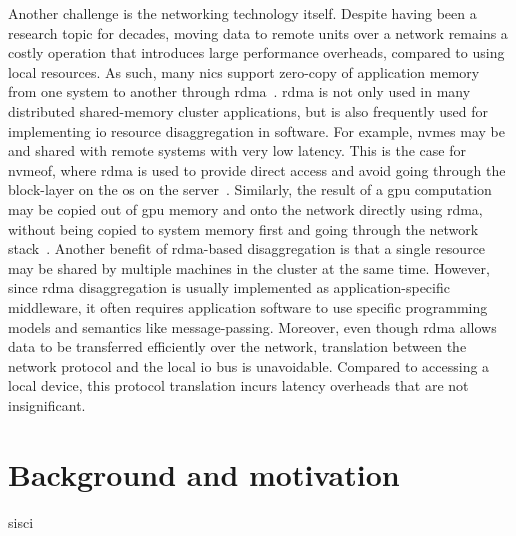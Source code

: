 Another challenge is the networking technology itself. Despite having been a research topic for decades, moving data to remote units over a network remains a costly operation that introduces large performance overheads, compared to using local resources.
%
As such, many \glspl{nic} support zero-copy of application memory from one system to another through \gls{rdma}~\cite{Huang2012}.
%
\Gls{rdma} is not only used in many distributed shared-memory cluster applications, but is also frequently used for implementing \gls{io} resource \gls{disaggregation} in software.
%
For example, \glspl{nvme} may be  and shared with remote systems with very low latency.
This is the case for \gls{nvmeof}, where \gls{rdma} is used to provide direct access and avoid going through the block-layer on the \gls{os} on the server~\cite{Guz2018}.
%
Similarly, the result of a \gls{gpu} computation may be copied out of \gls{gpu} memory and onto the network directly using \gls{rdma}, without being copied to system memory first and going through the network stack~\cite{Venkatesh2014}.
%
Another benefit of \gls{rdma}-based \gls{disaggregation} is that a single resource may be shared by multiple machines in the cluster at the same time.
%
However, since \gls{rdma} \gls{disaggregation} is usually implemented as application-specific \gls{middleware}, it often requires application software to use specific programming models and semantics like message-passing.
%
Moreover, even though \gls{rdma} allows data to be transferred efficiently over the network, translation between the network protocol and the local \gls{io} bus is unavoidable. 
Compared to accessing a local device, this protocol translation incurs latency overheads that are not insignificant.



\section{Background and motivation}\label{sec:motivation}
\gls{sisci}


%



